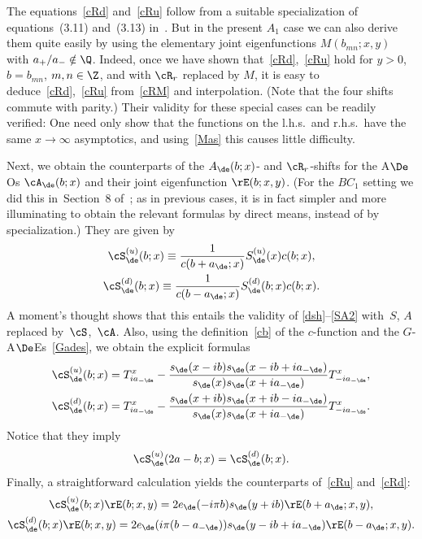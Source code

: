 \documentclass[pdftex]{sigma}
\numberwithin{equation}{section}
\begin{document}
The equations~\eqref{cRd} and~\eqref{cRu} follow from a suitable specialization of equations~(3.11) and~(3.13) in~\cite{anne}. But in the present $A_1$ case we can also derive them quite easily by using the elementary joint eigenfunctions $M(b_{mn};x,y)$ with $a_{+}/a_{-}\notin\Q$. Indeed, once we have shown that~\eqref{cRd},~\eqref{cRu} hold for $y>0$, $b=b_{mn}$,  $m,n\in\Z$, and with $\cR_r$ replaced by $M$, it is easy to deduce~\eqref{cRd},~\eqref{cRu} from~\eqref{cRM} and interpolation. (Note that the four shifts commute with parity.) Their validity for these special cases can be readily verif\/ied: One need only show that the functions on the l.h.s.\ and r.h.s.\ have the same $x\to \infty$ asymptotics, and using~\eqref{Mas} this causes little dif\/f\/iculty.

Next, we obtain the counterparts of the $A_{\de}(b;x)$- and $\cR_r$-shifts for the A$\De$Os $\cA_{\de}(b;x)$ and their joint eigenfunction $\rE(b;x,y)$. (For the $BC_1$ setting we did this in~Section~8 of~\cite{quad}; as in previous cases, it is in fact simpler and more illuminating to obtain the relevant formulas by direct means, instead of by specialization.) They are given by
\begin{gather}\label{sSu}
\cS_{\de}^{(u)}(b;x)\equiv \frac{1}{c(b+a_{\de};x)}S_{\de}^{(u)}(x)c(b;x),
\\
\label{sSd}
\cS_{\de}^{(d)}(b;x)\equiv \frac{1}{c(b-a_{\de};x)}S_{\de}^{(d)}(b;x)c(b;x).
\end{gather}
A moment's thought shows that this entails the validity of \eqref{dsh}--\eqref{SA2} with~$S$, $A$ replaced by~$\cS$,~$\cA$. Also, using the def\/inition~\eqref{cb} of the $c$-function and the $G$-A$\De$Es~\eqref{Gades}, we obtain the explicit formulas
\begin{gather}\label{sSuex}
\cS_{\de}^{(u)}(b;x)=T^x_{ia_{-\de}}-\frac{s_{\de}(x-ib)s_{\de}(x-ib+ia_{-\de})}{s_{\de}(x)s_{\de}(x+ia_{-\de})}T^x_{-ia_{-\de}},
\\
\label{sSdex}
\cS_{\de}^{(d)}(b;x)=T^x_{ia_{-\de}}-\frac{s_{\de}(x+ib)s_{\de}(x+ib-ia_{-\de})}{s_{\de}(x)s_{\de}(x+ia_{-\de})}T^x_{-ia_{-\de}}.
\end{gather}
Notice that they imply
\begin{gather}\label{udrel}
\cS_{\de}^{(u)}(2a-b;x)=\cS_{\de}^{(d)}(b;x).
\end{gather}
Finally,  a straightforward calculation yields the counterparts of~\eqref{cRu} and~\eqref{cRd}:
\begin{gather}
\cS_{\de}^{(u)}(b;x)\rE(b;x,y)=2e_{\de}(-i\pi b)s_{\de}(y+ib)
\rE(b+a_{\de};x,y),
\\
\cS_{\de}^{(d)}(b;x)\rE(b;x,y)=2e_{\de}(i\pi (b-a_{-\de}))s_{\de}(y-ib+ia_{-\de})\rE(b-a_{\de};x,y).
\end{gather}
\end{document}
